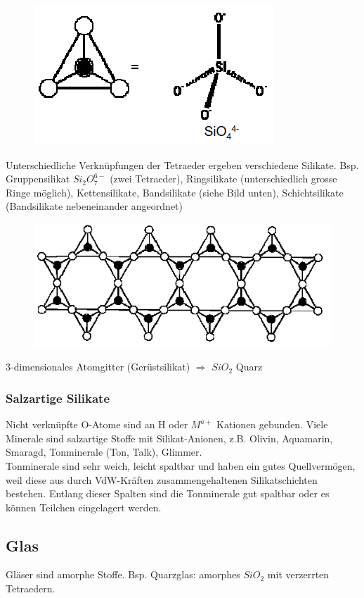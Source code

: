 \begin{figure}[htbp]
	\centering
	\includegraphics[width=0.4\linewidth]{images/8_SiO4.png}
\end{figure}

Unterschiedliche Verknüpfungen der Tetraeder ergeben verschiedene Silikate. Bsp. Gruppensilikat $Si_2O_7^{6-}$ (zwei Tetraeder), Ringsilikate (unterschiedlich grosse Ringe möglich), Kettensilikate, Bandsilikate  (siehe Bild unten), Schichtsilikate (Bandsilikate nebeneinander angeordnet)

\begin{figure}[htbp]
	\centering
	\includegraphics[width=0.7\linewidth]{images/8_Bandsilikat.png}
\end{figure}

3-dimensionales Atomgitter (Gerüstsilikat) $\Rightarrow$ $SiO_2$ Quarz

\subsubsection{Salzartige Silikate}
Nicht verknüpfte O-Atome sind an H oder $M^{a+}$ Kationen gebunden. Viele Minerale sind salzartige Stoffe mit Silikat-Anionen, z.B. Olivin, Aquamarin, Smaragd, Tonminerale (Ton, Talk), Glimmer. \\

Tonminerale sind sehr weich, leicht spaltbar und haben ein gutes Quellvermögen, weil diese aus durch VdW-Kräften zusammengehaltenen Silikatschichten bestehen. Entlang dieser Spalten sind die Tonminerale gut spaltbar oder es können Teilchen eingelagert werden. 

\subsection{Glas}
Gläser sind amorphe Stoffe. Bsp. Quarzglas: amorphes $SiO_2$ mit verzerrten Tetraedern.
